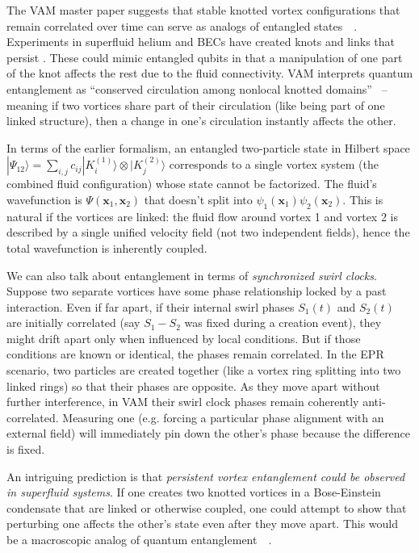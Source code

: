 \documentclass[a4paper,12pt]{article}
\begin{document}
    The VAM master paper suggests that stable knotted vortex configurations that remain correlated over time can serve as analogs of entangled states~\cite{reference_104}~\cite{reference_105}. Experiments in superfluid helium and BECs have created knots and links that persist \cite{Irvine2013-knots}. These could mimic entangled qubits in that a manipulation of one part of the knot affects the rest due to the fluid connectivity. VAM interprets quantum entanglement as “conserved circulation among nonlocal knotted domains”~\cite{reference_106} – meaning if two vortices share part of their circulation (like being part of one linked structure), then a change in one’s circulation instantly affects the other.

    In terms of the earlier formalism, an entangled two-particle state in Hilbert space $|\Psi_{12}\rangle = \sum_{i,j} c_{ij} |K_i^{(1)}\rangle\otimes|K_j^{(2)}\rangle$ corresponds to a single vortex system (the combined fluid configuration) whose state cannot be factorized. The fluid’s wavefunction is $\Psi(\mathbf{x}_1, \mathbf{x}_2)$ that doesn’t split into $\psi_1(\mathbf{x}_1)\psi_2(\mathbf{x}_2)$. This is natural if the vortices are linked: the fluid flow around vortex 1 and vortex 2 is described by a single unified velocity field (not two independent fields), hence the total wavefunction is inherently coupled.

    We can also talk about entanglement in terms of \emph{synchronized swirl clocks}. Suppose two separate vortices have some phase relationship locked by a past interaction. Even if far apart, if their internal swirl phases $S_1(t)$ and $S_2(t)$ are initially correlated (say $S_1 - S_2$ was fixed during a creation event), they might drift apart only when influenced by local conditions. But if those conditions are known or identical, the phases remain correlated. In the EPR scenario, two particles are created together (like a vortex ring splitting into two linked rings) so that their phases are opposite. As they move apart without further interference, in VAM their swirl clock phases remain coherently anti-correlated. Measuring one (e.g. forcing a particular phase alignment with an external field) will immediately pin down the other’s phase because the difference is fixed.

    An intriguing prediction is that \emph{persistent vortex entanglement could be observed in superfluid systems}. If one creates two knotted vortices in a Bose-Einstein condensate that are linked or otherwise coupled, one could attempt to show that perturbing one affects the other’s state even after they move apart. This would be a macroscopic analog of quantum entanglement~\cite{reference_107}~\cite{reference_108}.
\end{document}

